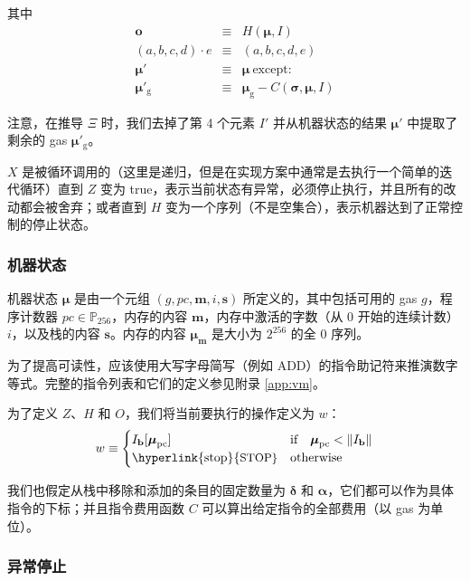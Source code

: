 \documentclass[9pt,oneside]{amsart}
\makeatletter
\newcommand{\linkdest}[1]{\Hy@raisedlink{\hypertarget{#1}{}}}
\makeatother
\begin{document}
\begin{multicols}{2}
其中
\begin{eqnarray}
\mathbf{o} & \equiv & H(\boldsymbol{\mu}, I) \\
(a, b, c, d) \cdot e & \equiv & (a, b, c, d, e) \\
\boldsymbol{\mu}' & \equiv & \boldsymbol{\mu}\ \text{except:} \\
\boldsymbol{\mu}'_{\mathrm{g}} & \equiv & \boldsymbol{\mu}_{\mathrm{g}} - C(\boldsymbol{\sigma}, \boldsymbol{\mu}, I)
\end{eqnarray}

注意，在推导 $\Xi$ 时，我们去掉了第 4 个元素 $I'$ 并从机器状态的结果 $\boldsymbol{\mu}'$ 中提取了剩余的 gas $\boldsymbol{\mu}'_{\mathrm{g}}$。

$X$ 是被循环调用的（这里是递归，但是在实现方案中通常是去执行一个简单的迭代循环）直到 \hyperlink{zhalt}{$Z$} 变为 true，表示当前状态有异常，必须停止执行，并且所有的改动都会被舍弃；或者直到 \hyperlink{hhalt}{$H$} 变为一个序列（不是空集合），表示机器达到了正常控制的停止状态。

\subsubsection{机器状态}
机器状态 $\boldsymbol{\mu}$ 是由一个元组 $(g, pc, \mathbf{m}, i, \mathbf{s})$ 所定义的，其中包括可用的 gas $g$，程序计数器 $pc \in \mathbb{P}_{256}$，内存的内容 $\mathbf{m}$，内存中激活的字数（从 0 开始的连续计数） $i$，以及栈的内容 $\mathbf{s}$。内存的内容 $\boldsymbol{\mu}_\mathbf{m}$ 是大小为 $2^{256}$ 的全 0 序列。

为了提高可读性，应该使用大写字母简写（例如 {\small ADD}）的指令助记符来推演数字等式。完整的指令列表和它们的定义参见附录 \ref{app:vm}。

为了定义 $Z$、$H$ 和 $O$，我们将当前要执行的操作定义为 $w$：
\begin{equation}\label{eq:currentoperation}
w \equiv \begin{cases} I_{\mathbf{b}}[\boldsymbol{\mu}_{\mathrm{pc}}] & \text{if} \quad \boldsymbol{\mu}_{\mathrm{pc}} < \lVert I_{\mathbf{b}} \rVert \\
\text{\hyperlink{stop}{\small STOP}} & \text{otherwise}
\end{cases}
\end{equation}

我们也假定从栈中移除和添加的条目的固定数量为 $\mathbf{\delta}$ 和 $\mathbf{\alpha}$，它们都可以作为具体指令的下标；并且指令费用函数 $C$ 可以算出给定指令的全部费用（以 gas 为单位）。

\subsubsection{异常停止}\hypertarget{Exceptional_Halting_function_Z}{}\linkdest{zhalt}


\end{multicols}
\end{document}
